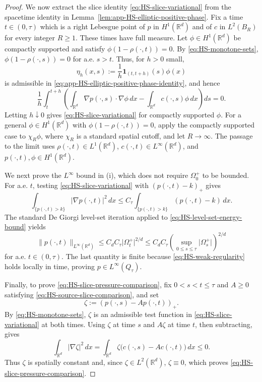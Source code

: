 \documentclass[11pt]{amsart}
\numberwithin{equation}{section}
\numberwithin{figure}{section}
\theoremstyle{plain}
\theoremstyle{definition}
\theoremstyle{remark}
\theoremstyle{plain}
\newcommand{\abs}[1]{\lvert #1 \rvert}
\newcommand{\norm}[1]{\lVert #1 \rVert}
\def\R{\mathbb{R}}
\begin{document}
\begin{proof}
We now extract the slice identity \eqref{eq:HS-slice-variational} from the
spacetime identity in Lemma~\ref{lem:app-HS-elliptic-positive-phase}.  Fix a
time \(t\in(0,\tau)\) which is a right Lebesgue point of \(p\) in
\(H^1(\R^d)\) and of \(c\) in \(L^2(B_R)\) for every integer \(R\geq1\).
These times have full measure.  Let
\(\phi\in H^1(\R^d)\) be compactly supported and satisfy
\(\phi(1-\rho(\cdot,t))=0\).  By \eqref{eq:HS-monotone-sets},
\(\phi(1-\rho(\cdot,s))=0\) for a.e. \(s>t\).  Thus, for \(h>0\) small,
\[
    \eta_h(x,s):=\frac1h\mathbf 1_{(t,t+h)}(s)\phi(x)
\]
is admissible in
\eqref{eq:app-HS-elliptic-positive-phase-identity}, and hence
\[
    \frac1h\int_t^{t+h}
    \left(
    \int_{\R^d}\nabla p(\cdot,s)\cdot\nabla\phi\,dx
    -
    \int_{\R^d}c(\cdot,s)\phi\,dx
    \right)ds=0 .
\]
Letting \(h\downarrow0\) gives \eqref{eq:HS-slice-variational} for compactly
supported \(\phi\).  For a general
\(\phi\in H^1(\R^d)\) with \(\phi(1-\rho(\cdot,t))=0\), apply the compactly
supported case to \(\chi_R\phi\), where \(\chi_R\) is a standard spatial
cutoff, and let \(R\to\infty\).  The passage to the limit uses
\(\rho(\cdot,t)\in L^1(\R^d)\), \(c(\cdot,t)\in L^\infty(\R^d)\), and
\(p(\cdot,t),\phi\in H^1(\R^d)\).

We next prove the \(L^\infty\) bound in (i), which does not require
\(\Omega_0^{+}\) to be bounded.  For a.e. \(t\), testing
\eqref{eq:HS-slice-variational} with
\((p(\cdot,t)-k)_+\) gives
\begin{equation}\label{eq:HS-level-set-energy-bound}
    \int_{\{p(\cdot,t)>k\}}\abs{\nabla p(\cdot,t)}^2\,dx
    \leq
    C_\tau\int_{\{p(\cdot,t)>k\}}(p(\cdot,t)-k)\,dx .
\end{equation}
The standard De Giorgi level-set iteration applied to
\eqref{eq:HS-level-set-energy-bound} yields
\begin{equation}\label{eq:HS-slice-Linfty-bound}
    \norm{p(\cdot,t)}_{L^\infty(\R^d)}
    \leq C_d C_\tau\abs{\Omega_t^{+}}^{2/d}
    \leq C_d C_\tau
    \left(\sup_{0\leq s\leq\tau}\abs{\Omega_s^{+}}\right)^{2/d}
\end{equation}
for a.e. \(t\in(0,\tau)\).  The last quantity is finite because
\eqref{eq:HS-weak-regularity} holds locally in time, proving
\(p\in L^\infty(Q_{\tau})\).

Finally, to prove \eqref{eq:HS-slice-pressure-comparison}, fix
\(0<s<t \leq\tau\) and \(A\geq0\) satisfying
\eqref{eq:HS-source-slice-comparison}, and set
\[
    \zeta:=(p(\cdot,s)-Ap(\cdot,t))_+ .
\]
By \eqref{eq:HS-monotone-sets}, \(\zeta\) is an admissible test function in
\eqref{eq:HS-slice-variational} at both times.
Using \(\zeta\) at time \(s\) and \(A\zeta\) at time \(t\), then
subtracting, gives
\[
    \int_{\R^d}\abs{\nabla\zeta}^2\,dx
    =
    \int_{\R^d}\zeta\bigl(c(\cdot,s)-Ac(\cdot,t)\bigr)\,dx
    \leq0 .
\]
Thus \(\zeta\) is spatially constant and, since
\(\zeta\in L^2(\R^d)\), $\zeta \equiv 0$, which proves
\eqref{eq:HS-slice-pressure-comparison}.
\end{proof}
\end{document}
